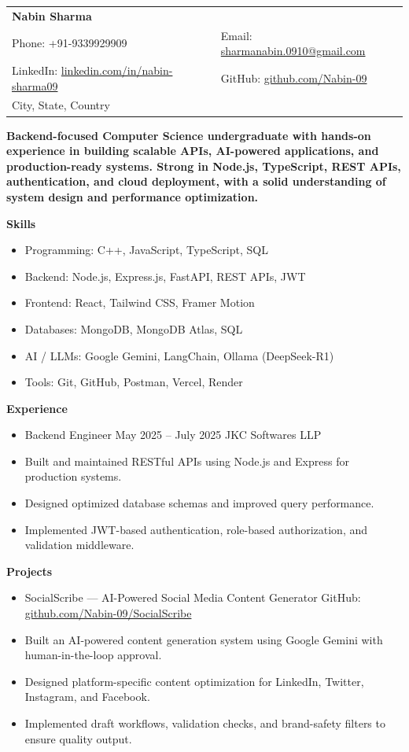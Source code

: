 \documentclass[12pt]{article}
\begin{document}
\begin{tabularx}{\textwidth}{@{}lX@{}}
\textbf{Nabin Sharma} & \\
Phone: +91-9339929909 & Email: \href{mailto:sharmanabin.0910@gmail.com}{sharmanabin.0910@gmail.com} \\
LinkedIn: \href{https://www.linkedin.com/in/nabin-sharma09}{linkedin.com/in/nabin-sharma09} & GitHub: \href{https://github.com/Nabin-09}{github.com/Nabin-09} \\
City, State, Country & \\
\end{tabularx}

\textbf{Backend-focused Computer Science undergraduate with hands-on experience in building scalable APIs, AI-powered applications, and production-ready systems. Strong in Node.js, TypeScript, REST APIs, authentication, and cloud deployment, with a solid understanding of system design and performance optimization.}

\textbf{Skills}

\begin{itemize}[noitemsep,topsep=0pt]
\item Programming: C++, JavaScript, TypeScript, SQL
\item Backend: Node.js, Express.js, FastAPI, REST APIs, JWT
\item Frontend: React, Tailwind CSS, Framer Motion
\item Databases: MongoDB, MongoDB Atlas, SQL
\item AI / LLMs: Google Gemini, LangChain, Ollama (DeepSeek-R1)
\item Tools: Git, GitHub, Postman, Vercel, Render
\end{itemize}

\textbf{Experience}

\begin{itemize}[noitemsep,topsep=0pt]
\item Backend Engineer May 2025 – July 2025
JKC Softwares LLP
\item Built and maintained RESTful APIs using Node.js and Express for production systems.
\item Designed optimized database schemas and improved query performance.
\item Implemented JWT-based authentication, role-based authorization, and validation middleware.
\end{itemize}

\textbf{Projects}

\begin{itemize}[noitemsep,topsep=0pt]
\item SocialScribe — AI-Powered Social Media Content Generator
GitHub: \href{https://github.com/Nabin-09/SocialScribe}{github.com/Nabin-09/SocialScribe}
\item Built an AI-powered content generation system using Google Gemini with human-in-the-loop approval.
\item Designed platform-specific content optimization for LinkedIn, Twitter, Instagram, and Facebook.
\item Implemented draft workflows, validation checks, and brand-safety filters to ensure quality output.
\end{itemize}
\end{document}
